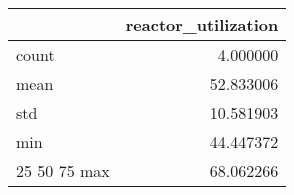 \begin{tabular}{lr}
\toprule
 & reactor\_utilization \\
\midrule
count & 4.000000 \\
mean & 52.833006 \\
std & 10.581903 \\
min & 44.447372 \\
25%
50%
75%
max & 68.062266 \\
\bottomrule
\end{tabular}

